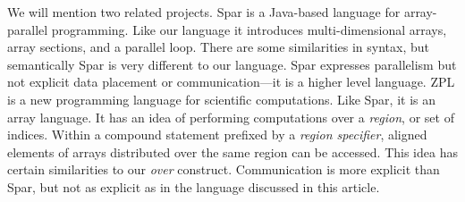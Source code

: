 We will mention two related projects.
Spar \cite{Spar} is a Java-based language for array-parallel programming.
Like our language it introduces multi-dimensional arrays, array
sections, and a parallel loop.  There are some similarities in syntax, but
semantically Spar is very different to our language.  Spar expresses
parallelism but not explicit data placement or communication---it is a
higher level language.
ZPL \cite{ZPL} is a new programming language for scientific
computations.  Like Spar, it is an array language.  It has an idea of
performing computations over a {\em region}, or set of indices.  Within
a compound statement prefixed by a {\em region specifier}, aligned
elements of arrays distributed over the same region can be accessed.
This idea has certain similarities to our {\em over} construct.
Communication is more explicit than Spar, but not as explicit as
in the language discussed in this article.





